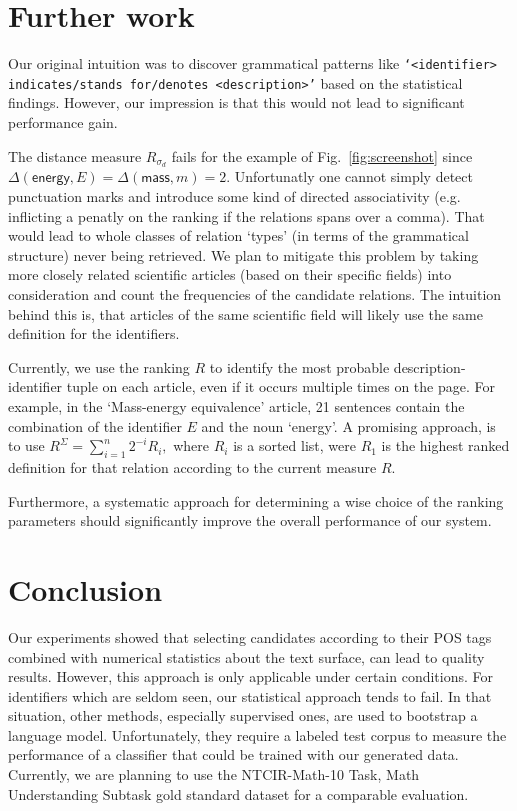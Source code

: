 \documentclass[runningheads]{llncs}
\begin{document}
\section{Further work}

Our original intuition was to discover grammatical patterns like
\texttt{`\emph{<identifier>} indicates/stands for/denotes
\emph{<description>}'} based on the statistical findings. However, our
impression is that this would not lead to significant performance gain.

The distance measure $R_{\sigma_d}$ fails for the example of
Fig.~\ref{fig:screenshot} since $\Delta(\mathsf{energy},E) =
\Delta(\mathsf{mass},m) = 2$. Unfortunatly one cannot simply detect
punctuation marks and introduce some kind of directed associativity (e.g.
inflicting a penatly on the ranking if the relations spans over a comma). That
would lead to whole classes of relation `types' (in terms of the grammatical
structure) never being retrieved. We plan to mitigate this problem by taking
more closely related scientific articles (based on their specific fields) into
consideration and count the frequencies of the candidate relations. The
intuition behind this is, that articles of the same scientific field will
likely use the same definition for the identifiers.

Currently, we use the ranking $R$ to identify the most probable description-
identifier tuple on each article, even if it occurs multiple times on the page.
For example, in the `Mass-energy equivalence' article, 21 sentences contain the
combination of the identifier $E$ and the noun `energy'. A promising approach,
is to use $R^\Sigma=\sum_{i=1}^n 2^{-i} R_i,$ where $R_i$ is a sorted list,
were $R_1$ is the highest ranked definition for that relation according to the
current measure $R$.

Furthermore, a systematic approach for determining a wise choice of the
ranking parameters should significantly improve the overall performance of our
system.


\section{Conclusion}

Our experiments showed that selecting candidates according to their POS tags
combined with numerical statistics about the text surface, can lead to quality
results. However, this approach is only applicable under certain conditions.
For identifiers which are seldom seen, our statistical approach tends to fail.
In that situation, other methods, especially supervised ones, are used to
bootstrap a language model. Unfortunately, they require a labeled test corpus
to measure the performance of a classifier that could be trained with our
generated data. Currently, we are planning to use the NTCIR-Math-10 Task, Math
Understanding Subtask gold standard dataset \cite{overview} for a comparable
evaluation.
\end{document}
